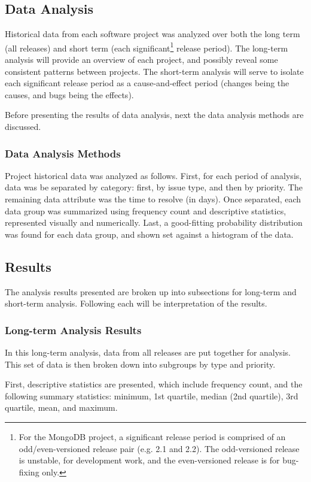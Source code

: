 \documentclass[a4paper]{scrartcl}
\begin{document}
\subsection{Data Analysis}
Historical data from each software project was analyzed over both the long term (all releases) and short term (each significant\footnote{For the MongoDB project, a significant release period is comprised of an odd/even-versioned release pair (e.g. 2.1 and 2.2). The odd-versioned release is unstable, for development work, and the even-versioned release is for bug-fixing only.} release period). The long-term analysis will provide an overview of each project, and possibly reveal some consistent patterns between projects. The short-term analysis will serve to isolate each significant release period as a cause-and-effect period (changes being the causes, and bugs being the effects).

Before presenting the results of data analysis, next the data analysis methods are discussed.

\subsubsection{Data Analysis Methods}
Project historical data was analyzed as follows. First, for each period of analysis, data was be separated by category: first, by issue type, and then by priority. The remaining data attribute was the time to resolve (in days). Once separated, each data group was summarized using frequency count and descriptive statistics, represented visually and numerically. Last, a good-fitting probability distribution was found for each data group, and shown set against a histogram of the data.

\subsection{Results}
The analysis results presented are broken up into subsections for long-term and short-term analysis. Following each will be interpretation of the results.

\subsubsection{Long-term Analysis Results}
In this long-term analysis, data from all releases are put together for analysis. This set of data is then broken down into subgroups by type and priority.

First, descriptive statistics are presented, which include frequency count, and the following summary statistics: minimum, 1st quartile, median (2nd quartile), 3rd quartile, mean, and maximum.
\end{document}
